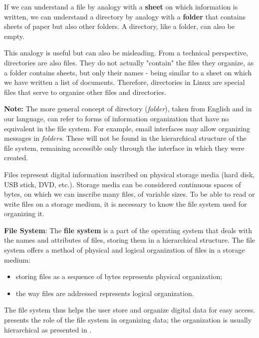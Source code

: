 If we can understand a file by analogy with a \textbf{sheet} on which information is written, we can understand a directory by analogy with a \textbf{folder} that contains sheets of paper but also other folders.
A directory, like a folder, can also be empty.

This analogy is useful but can also be misleading.
From a technical perspective, directories are also files.
They do not actually "contain" the files they organize, as a folder contains sheets, but only their names - being similar to a sheet on which we have written a list of documents.
Therefore, directories in Linux are special files that serve to organize other files and directories.

\textbf{Note:} The more general concept of directory (\textit{folder}), taken from English and in our language, can refer to forms of information organization that have no equivalent in the file system.
For example, email interfaces may allow organizing messages in \textit{folders}.
These will not be found in the hierarchical structure of the file system, remaining accessible only through the interface in which they were created.

Files represent digital information inscribed on physical storage media (hard disk, USB stick, DVD, etc.).
Storage media can be considered continuous spaces of bytes, on which we can inscribe many files, of variable sizes.
To be able to read or write files on a storage medium, it is necessary to know the file system used for organizing it.

\textbf{File System}: The \textbf{file system} is a part of the operating system that deals with the names and attributes of files, storing them in a hierarchical structure.
The file system offers a method of physical and logical organization of files in a storage medium:

\begin{itemize}
  \item storing files as a sequence of bytes represents physical organization;
  \item the way files are addressed represents logical organization.
\end{itemize}

The file system thus helps the user store and organize digital data for easy access.
 presents the role of the file system in organizing data;
the organization is usually hierarchical as presented in .

